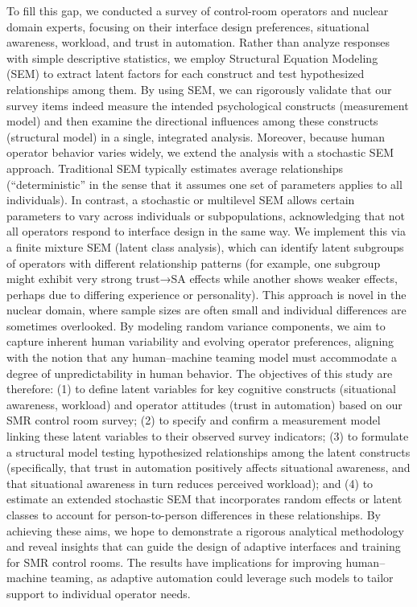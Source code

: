 \documentclass[conference]{IEEEtran}
\begin{document}
To fill this gap, we conducted a survey of control-room operators and nuclear domain experts, focusing on their interface design preferences, situational awareness, workload, and trust in automation. Rather than analyze responses with simple descriptive statistics, we employ Structural Equation Modeling (SEM) to extract latent factors for each construct and test hypothesized relationships among them. By using SEM, we can rigorously validate that our survey items indeed measure the intended psychological constructs (measurement model) and then examine the directional influences among these constructs (structural model) in a single, integrated analysis. Moreover, because human operator behavior varies widely, we extend the analysis with a stochastic SEM approach. Traditional SEM typically estimates average relationships (“deterministic” in the sense that it assumes one set of parameters applies to all individuals). In contrast, a stochastic or multilevel SEM allows certain parameters to vary across individuals or subpopulations, acknowledging that not all operators respond to interface design in the same way. We implement this via a finite mixture SEM (latent class analysis), which can identify latent subgroups of operators with different relationship patterns (for example, one subgroup might exhibit very strong trust→SA effects while another shows weaker effects, perhaps due to differing experience or personality). This approach is novel in the nuclear domain, where sample sizes are often small and individual differences are sometimes overlooked. By modeling random variance components, we aim to capture inherent human variability and evolving operator preferences, aligning with the notion that any human–machine teaming model must accommodate a degree of unpredictability in human behavior. The objectives of this study are therefore: (1) to define latent variables for key cognitive constructs (situational awareness, workload) and operator attitudes (trust in automation) based on our SMR control room survey; (2) to specify and confirm a measurement model linking these latent variables to their observed survey indicators; (3) to formulate a structural model testing hypothesized relationships among the latent constructs (specifically, that trust in automation positively affects situational awareness, and that situational awareness in turn reduces perceived workload); and (4) to estimate an extended stochastic SEM that incorporates random effects or latent classes to account for person-to-person differences in these relationships. By achieving these aims, we hope to demonstrate a rigorous analytical methodology and reveal insights that can guide the design of adaptive interfaces and training for SMR control rooms. The results have implications for improving human–machine teaming, as adaptive automation could leverage such models to tailor support to individual operator needs.
\end{document}
